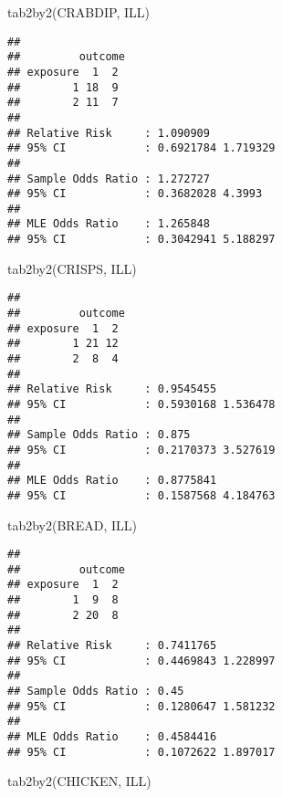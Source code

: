\documentclass[
  12pt,
  a4paper]{book}
\newenvironment{Shaded}{\begin{snugshade}}{\end{snugshade}}
\newcommand{\FunctionTok}[1]{\textcolor[rgb]{0.00,0.00,0.00}{#1}}
\newcommand{\NormalTok}[1]{#1}
\begin{document}
\newpage

\begin{Shaded}
\begin{Highlighting}[]
\FunctionTok{tab2by2}\NormalTok{(CRABDIP, ILL)}
\end{Highlighting}
\end{Shaded}

\begin{verbatim}
## 
##         outcome
## exposure  1  2
##        1 18  9
##        2 11  7
## 
## Relative Risk     : 1.090909 
## 95% CI            : 0.6921784 1.719329 
## 
## Sample Odds Ratio : 1.272727 
## 95% CI            : 0.3682028 4.3993 
## 
## MLE Odds Ratio    : 1.265848 
## 95% CI            : 0.3042941 5.188297
\end{verbatim}

\begin{Shaded}
\begin{Highlighting}[]
\FunctionTok{tab2by2}\NormalTok{(CRISPS, ILL)}
\end{Highlighting}
\end{Shaded}

\begin{verbatim}
## 
##         outcome
## exposure  1  2
##        1 21 12
##        2  8  4
## 
## Relative Risk     : 0.9545455 
## 95% CI            : 0.5930168 1.536478 
## 
## Sample Odds Ratio : 0.875 
## 95% CI            : 0.2170373 3.527619 
## 
## MLE Odds Ratio    : 0.8775841 
## 95% CI            : 0.1587568 4.184763
\end{verbatim}

\newpage

\begin{Shaded}
\begin{Highlighting}[]
\FunctionTok{tab2by2}\NormalTok{(BREAD, ILL)}
\end{Highlighting}
\end{Shaded}

\begin{verbatim}
## 
##         outcome
## exposure  1  2
##        1  9  8
##        2 20  8
## 
## Relative Risk     : 0.7411765 
## 95% CI            : 0.4469843 1.228997 
## 
## Sample Odds Ratio : 0.45 
## 95% CI            : 0.1280647 1.581232 
## 
## MLE Odds Ratio    : 0.4584416 
## 95% CI            : 0.1072622 1.897017
\end{verbatim}

\begin{Shaded}
\begin{Highlighting}[]
\FunctionTok{tab2by2}\NormalTok{(CHICKEN, ILL)}
\end{Highlighting}
\end{Shaded}
\end{document}
